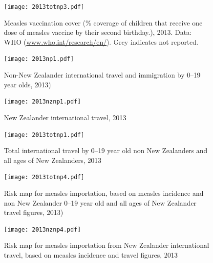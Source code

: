 \documentclass{article}
\begin{document}
\begin{figure}
\begin{center}
     \texttt{[image: 2013totnp3.pdf]}
\end{center}
\caption{Measles vaccination cover (\% coverage of children that receive one dose of measles vaccine by their second birthday.), 2013. Data: WHO (\href{http://www.who.int/research/en/}{www.who.int/research/en/}). Grey indicates not reported.}
\label{fig:cover12}
\end{figure}

\begin{figure}
\begin{center}
     \texttt{[image: 2013np1.pdf]}
\end{center}
\caption{Non-New Zealander international travel and immigration by 0--19 year olds, 2013)}
\label{fig:immigration12}
\end{figure}

\begin{figure}
\begin{center}
     \texttt{[image: 2013nznp1.pdf]}
\end{center}
\caption{New Zealander international travel, 2013}
\label{fig:nztravel12}
\end{figure}

\begin{figure}
\begin{center}
     \texttt{[image: 2013totnp1.pdf]}
\end{center}
\caption{Total international travel by 0--19 year old non New Zealanders and all ages of New Zealanders, 2013}
\label{fig:travel12}
\end{figure}

\begin{figure}
\begin{center}
     \texttt{[image: 2013totnp4.pdf]}
\end{center}
\caption{Risk map for measles importation, based on measles incidence and non New Zealander 0--19 year old and all ages of New Zealander travel figures, 2013)}
\label{fig:risk12}
\end{figure}

\begin{figure}
\begin{center}
     \texttt{[image: 2013nznp4.pdf]}
\end{center}
\caption{Risk map for measles importation from New Zealander international travel, based on measles incidence and travel figures, 2013}
\label{fig:nzrisk12}
\end{figure}
\end{document}
